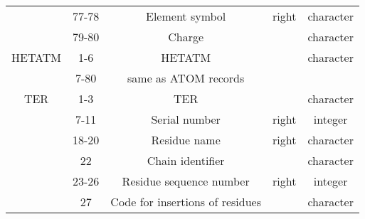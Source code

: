 \begin{appendices}
\begin{table}[]
\begin{tabular}{|c|c|c|c|c|}
            & 77-78   & Element symbol                  & right         & character  \\
            & 79-80   & Charge                          &               & character  \\ \hline
HETATM      & 1-6     & HETATM                          &               & character  \\ 
            & 7-80    & same as ATOM records            &               &            \\ \hline
TER         & 1-3     & TER                             &               & character  \\
            & 7-11    & Serial number                   & right         & integer    \\
            & 18-20   & Residue name                    & right         & character  \\
            & 22      & Chain identifier                &               & character  \\
            & 23-26   & Residue sequence number         & right         & integer    \\
            & 27      & Code for insertions of residues &               & character  \\ \hline
\end{tabular}
\end{table}

\end{appendices}
